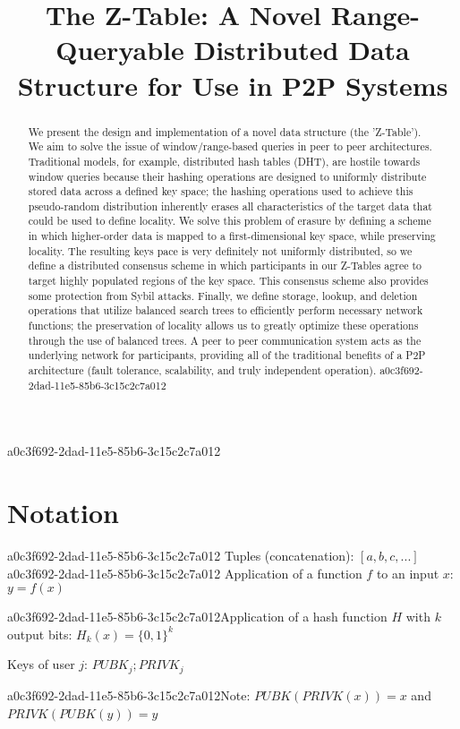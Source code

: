 \documentclass[12pt]{article}
\title{The Z-Table: A Novel Range-Queryable Distributed Data Structure for Use in P2P Systems}
\begin{document}
a0c3f692-2dad-11e5-85b6-3c15c2c7a012
\maketitle

\begin{abstract}
We present the design and implementation of a novel data structure (the 'Z-Table'). We aim to solve the issue of window/range-based queries in peer to peer architectures. Traditional models, for example,  distributed hash tables (DHT), are hostile towards window queries because their hashing operations are designed to uniformly distribute stored data across a defined key space; the hashing operations used to achieve this pseudo-random distribution inherently erases all characteristics of the target data that could be used to define locality. We solve this problem of erasure by defining a scheme in which higher-order data is mapped to a first-dimensional key space, while preserving locality. The resulting keys pace is very definitely not uniformly distributed, so we define a distributed consensus scheme in which participants in our Z-Tables agree to target highly populated regions of the key space. This consensus scheme also provides some protection from Sybil attacks. Finally, we define storage, lookup, and deletion operations that utilize balanced search trees to efficiently perform necessary network functions; the preservation of locality allows us to greatly optimize these operations through the use of balanced trees. A peer to peer communication system acts as the underlying network for participants, providing all of the traditional benefits of a P2P architecture (fault tolerance, scalability, and truly independent operation).
a0c3f692-2dad-11e5-85b6-3c15c2c7a012\end{abstract}

\section{Notation}
a0c3f692-2dad-11e5-85b6-3c15c2c7a012
Tuples (concatenation): $[a,b,c,...]$
a0c3f692-2dad-11e5-85b6-3c15c2c7a012
Application of a function $f$ to an input $x$: $y=f(x)$

a0c3f692-2dad-11e5-85b6-3c15c2c7a012Application of a hash function $H$ with $k$ output bits: $H_{k}(x) = \{0,1\}^k$

Keys of user $j$: $ PUBK_j; PRIVK_j $

a0c3f692-2dad-11e5-85b6-3c15c2c7a012Note: $PUBK(PRIVK(x)) = x$ and $PRIVK(PUBK(y)) = y$~
\end{document}
